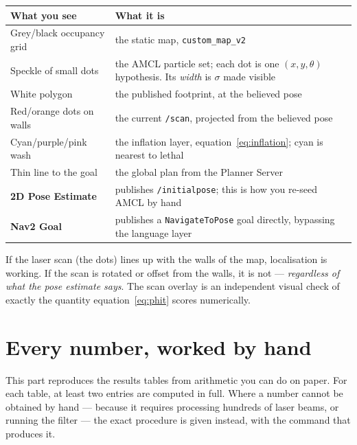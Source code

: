 \documentclass[11pt,a4paper]{report}
\newcommand{\file}[1]{\texttt{\small #1}}
\begin{document}
\begin{center}
\small
\begin{tabular}{@{}lp{9.6cm}@{}}
\toprule
\textbf{What you see} & \textbf{What it is} \\
\midrule
Grey/black occupancy grid & the static map, \file{custom\_map\_v2} \\
Speckle of small dots     & the AMCL particle set; each dot is one
                            $(x,y,\theta)$ hypothesis. Its \emph{width} is
                            $\sigma$ made visible \\
White polygon             & the published footprint, at the believed pose \\
Red/orange dots on walls  & the current \file{/scan}, projected from the
                            believed pose \\
Cyan/purple/pink wash     & the inflation layer, equation~\eqref{eq:inflation};
                            cyan is nearest to lethal \\
Thin line to the goal     & the global plan from the Planner Server \\
\textbf{2D Pose Estimate} & publishes \file{/initialpose}; this is how you
                            re-seed AMCL by hand \\
\textbf{Nav2 Goal}        & publishes a \file{NavigateToPose} goal directly,
                            bypassing the language layer \\
\bottomrule
\end{tabular}
\end{center}

\begin{keyidea}
If the laser scan (the dots) lines up with the walls of the map, localisation
is working. If the scan is rotated or offset from the walls, it is not ---
\emph{regardless of what the pose estimate says}. The scan overlay is an
independent visual check of exactly the quantity equation~\eqref{eq:phit}
scores numerically.
\end{keyidea}

\chapter{Every number, worked by hand}
\label{ch:byhand}

This part reproduces the results tables from arithmetic you can do on paper.
For each table, at least two entries are computed in full. Where a number
cannot be obtained by hand --- because it requires processing hundreds of
laser beams, or running the filter --- the exact procedure is given instead,
with the command that produces it.
\end{document}
